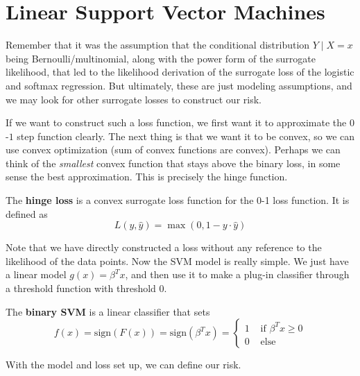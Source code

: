\section{Linear Support Vector Machines} 

  Remember that it was the assumption that the conditional distribution $Y \mid X = x$ being Bernoulli/multinomial, along with the power form of the surrogate likelihood, that led to the likelihood derivation of the surrogate loss of the logistic and softmax regression. But ultimately, these are just modeling assumptions, and we may look for other surrogate losses to construct our risk. 

  If we want to construct such a loss function, we first want it to approximate the $0$-$1$ step function clearly. The next thing is that we want it to be convex, so we can use convex optimization (sum of convex functions are convex). Perhaps we can think of the \textit{smallest} convex function that stays above the binary loss, in some sense the best approximation. This is precisely the hinge function. 

  \begin{definition}
    The \textbf{hinge loss} is a convex surrogate loss function for the 0-1 loss function. It is defined as 
    \begin{equation}
      L(y, \hat{y}) = \max(0, 1 - y \cdot \hat{y})
    \end{equation}
  \end{definition} 

  Note that we have directly constructed a loss without any reference to the likelihood of the data points. Now the SVM model is really simple. We just have a linear model $g(x) = \beta^T x$, and then use it to make a plug-in classifier through a threshold function with threshold $0$. 

  \begin{definition}
    The \textbf{binary SVM} is a linear classifier that sets 
    \begin{equation}
      f(x) = \mathrm{sign}(F(x)) = \mathrm{sign}(\beta^T x) = \begin{cases} 
        1 & \text{ if } \beta^T x \geq 0 \\
        0 & \text{ else}
      \end{cases}
    \end{equation}
  \end{definition} 

  With the model and loss set up, we can define our risk.

